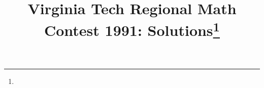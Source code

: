 \documentclass[10pt]{article}
\begin{document}
\title{Virginia Tech Regional Math Contest 1991: Solutions\footnote{\disclaimer}}
\author{\vspace{-2ex}}
\date{\vspace{-5ex}} %
\maketitle

%

%

%

%

%

%

%

%
\end{document}
